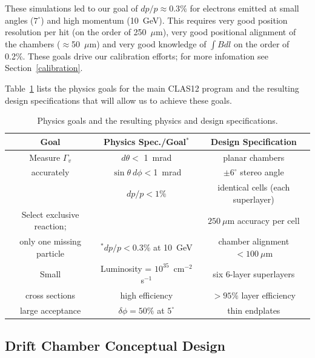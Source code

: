 These simulations led to our goal of $dp/p \approx 0.3\%$ 
for electrons emitted at small angles ($7^{\circ}$) and high momentum (10~GeV).
This requires very good position resolution per hit (on the order of 250~$\mu$m),
very good positional alignment of the chambers ($\approx$50~$\mu$m) and very good knowledge
of $\int Bdl$ on the order of 0.2\%.  These goals drive our calibration efforts; for more
infomation see Section~\ref{calibration}.

Table~\ref{fwd-dc-physics-specifications} lists the physics goals for the main CLAS12 program
and the resulting design specifications that will allow us to achieve these goals.

\small{
\begin{table}[ht]
\begin{center}
\begin{tabular}{||c|c|c||} \hline \hline
   {\bf Goal}         & {\bf Physics Spec./Goal$^*$} & {\bf Design Specification}\\ \hline
Measure $\Gamma_v$  & $d \theta <$ 1~mrad   & planar chambers \\ 
accurately  & $\sin \theta ~d \phi < $1~mrad & $\pm 6^\circ$ stereo angle   \\ 
  & $dp/p < 1\% $ & identical cells (each superlayer)  \\ \hline
Select exclusive reaction; &    & $250~\mu$m  accuracy per cell\\ 
only one missing particle    & $^*$$dp/p < 0.3\%$ at 10~GeV &    chamber alignment $<100~\mu$m\\  \hline
Small       & Luminosity = $10^{35}$~cm$^{-2}$s$^{-1}$  & six 6-layer superlayers \\ 
cross sections  & high efficiency & $> 95\%$ layer efficiency \\ \hline
large acceptance   & $\delta\phi = 50\%$ at $5^\circ$ & thin endplates\\ \hline
\end{tabular}
\caption{\small{Physics goals and the resulting physics and design specifications.}}
\label{fwd-dc-physics-specifications}
\end{center}
\end{table}
}

\subsection{Drift Chamber Conceptual Design}

